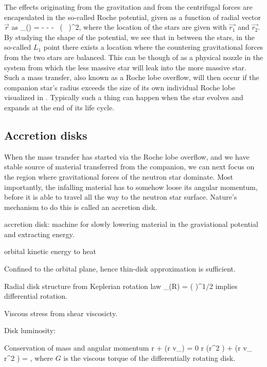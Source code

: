 The effects originating from the gravitation and from the centrifugal forces are encapsulated in the so-called Roche potential, given as a function of radial vector $\vec{r}$ as\cite[see, e.g.,][]{PRP02, LL15}
\be
\Phi_{}() = - - -  ( \vec{ \omega } \times {} )^2,
\ee
where the location of the stars are given with $\vec{r_1}$ and $\vec{r_2}$.
By studying the shape of the potential, we see that in between the stars, in the so-called $L_1$ point there exists a location where the countering gravitational forces from the two stars are balanced.
This can be though of as a physical nozzle in the system from which the less massive star will leak into the more massive star.
Such a mass transfer, also known as a Roche lobe overflow, will then occur if the companion star's radius exceeds the size of its own individual Roche lobe visualized in .
Typically such a thing can happen when the star evolves and expands at the end of its life cycle. 


\subsection{Accretion disks}

When the mass transfer has started via the Roche lobe overflow, and we have stable source of material transferred from the companion, we can next focus on the region where gravitational forces of the neutron star dominate.
Most importantly, the infalling material has to somehow loose its angular momentum, before it is able to travel all the way to the neutron star surface.
Nature's mechanism to do this is called an accretion disk.


accretion disk: machine for slowly lowering material in the graviational potential and extracting energy.

orbital kinetic energy to heat

Confined to the orbital plane, hence thin-disk approximation is sufficient.

Radial disk structure from Keplerian rotation law 
\be
\Omega_{}(R) = \left(  \right)^{1/2}
\ee
implies differential rotation.

Viscous stress from shear viscosicty.

Disk luminosity:

Conservation of mass and angular momentum
\be
r  + (r \Sigma v_{}) = 0
\ee
\be
r (\Sigma r^2 \Omega) +  (r \Sigma v_{} r^2 \Omega) =  ,
\ee
where $G$ is the viscous torque of the differentially rotating disk.

